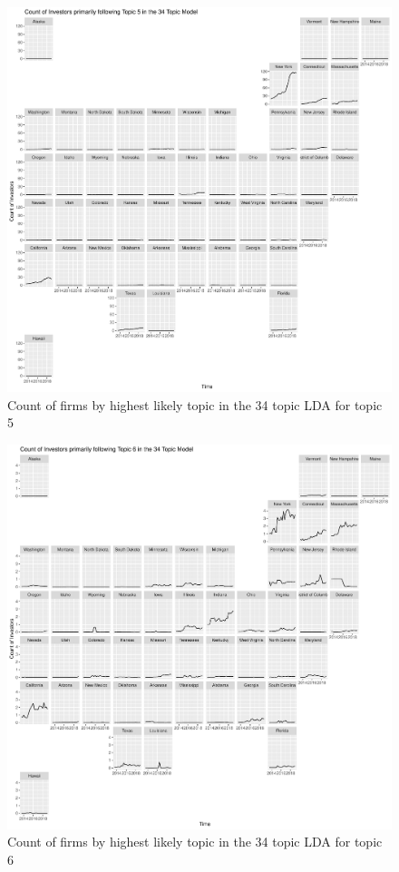 		\begin{figure}
		\centering
		\includegraphics[width=1\linewidth]{Figures/ChapterV/USA_34_Topic05.pdf}
		\caption[Count of Firms for Topic 5 by Quarter]{Count of firms by highest likely topic in the 34 topic LDA for topic 5}
		\label{fig:StateLDA5}
	\end{figure}
	
		\begin{figure}
		\centering
		\includegraphics[width=1\linewidth]{Figures/ChapterV/USA_34_Topic06.pdf}
		\caption[Count of Firms for Topic 6 by Quarter]{Count of firms by highest likely topic in the 34 topic LDA for topic 6}
		\label{fig:StateLDA6}
	\end{figure}
	
